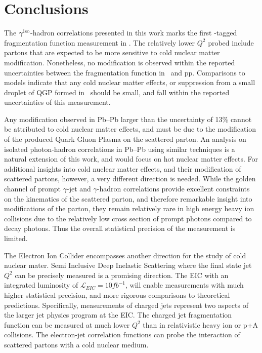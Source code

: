 







\chapter{Conclusions}

The $\gamma^\mathrm{iso}$-hadron correlations presented in this work marks the first \gammaiso-tagged fragmentation function measurement in \pPb. The relatively lower $Q^2$ probed include partons that are expected to be more sensitive to cold nuclear matter modification. Nonetheless, no modification is observed within the reported uncertainties between the fragmentation function in \pPb~and pp. Comparisons to models indicate that any cold nuclear matter effects, or suppression from a small droplet of QGP formed in \pPb~should be small, and fall within the reported uncertainties of this measurement. 

Any modification observed in Pb--Pb larger than the uncertainty of 13\% cannot be attributed to cold nuclear matter effects, and must be due to the modification of the produced Quark Gluon Plasma on the scattered parton. An analysis on isolated photon-hadron correlations in Pb--Pb using similar techniques is a natural extension of this work, and would focus on hot nuclear matter effects. For additional insights into cold nuclear matter effects, and their modification of scattered partons, however, a very different direction is needed. While the golden channel of prompt $\gamma$-jet and $\gamma$-hadron correlations provide excellent constraints on the kinematics of the scattered parton, and therefore remarkable insight into modifications of the parton, they remain relatively rare in high energy heavy ion collisions due to the relatively low cross section of prompt photons compared to decay photons. Thus the overall statistical precision of the measurement is limited. 

The Electron Ion Collider encompasses another direction for the study of cold nuclear mater. Semi Inclusive Deep Inelastic Scattering where the final state jet $Q^2$ can be precisely measured is a promising direction. The EIC with an integrated luminosity of $\mathcal{L}_{EIC}=10fb^{-1}$, will enable measurements with much higher statistical precision, and more rigorous comparisons to theoretical predictions. Specifically, measurements of charged jets represent two aspects of the larger jet physics program at the EIC. The charged jet fragmentation function can be measured at much lower $Q^2$ than in relativistic heavy ion or p+A collisions. The electron-jet correlation functions can probe the interaction of scattered partons with a cold nuclear medium. 

